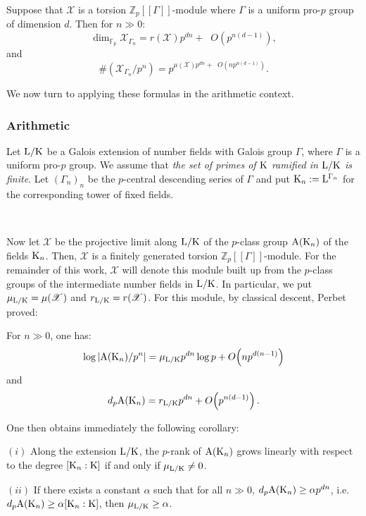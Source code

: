 \documentclass[12pt,a4paper,twoside,english]{smfart}
\def\K{{\rm K}}
\def\L{{\rm L}}
\def\Z{{\mathbb Z}}
\def\fq{{\mathbb F}}
\def\X{{\mathcal X}}
\def\A{{\rm A}}
\newcommand{\bigO}[1]{\ensuremath{\mathop{}\mathopen{}O\mathopen{}\left(#1\right)}}
\begin{document}
\begin{theo} Suppose that   $\X$ is a torsion $\Z_p[[\Gamma]]$-module where $\Gamma$ is a uniform pro-$p$ group of dimension $d$.   Then for $n \gg 0$:
 $$\dim_{\fq_p} \X_{\Gamma_n} =r(\X) p^{dn} + \bigO{p^{n(d-1)}},$$
 and
 $$\# (\X_{\Gamma_n}/p^n) = p^{\mu(\X) p^{dn} + \bigO{np^{n(d-1)}}}.$$
\end{theo}

We now turn to applying these formulas in the arithmetic context. 

\subsubsection{Arithmetic}\label{sectionarithmetic}

Let $\L/\K$  be a Galois extension of number fields with Galois group $\Gamma$, where $\Gamma$ is a uniform pro-$p$ group.
We assume that \emph{the set of primes of $\K$ ramified in $\L/\K$ is finite}.
Let $(\Gamma_n)_n$ be the $p$-central descending series of $\Gamma$ and put $\K_n:=\L^{\Gamma_n}$ for the corresponding tower of fixed fields. 

\

Now let  $\X$ be the projective limit along $\L/\K$ of the $p$-class group $\A(\K_n)$ of the fields $\K_n$. 
Then, $\X$ is a finitely generated torsion $\Z_p[[\Gamma]]$-module.  For the remainder of this work, $\X$ will denote this module built up from the $p$-class groups of the intermediate number fields in $\L/\K$.  In particular, we put $\mu_{\L/\K}=\mu(\X)$ and $r_{\L/\K}=r(\X)$.  For this module, by classical descent, Perbet proved:

\begin{theo} For $n \gg 0$, one has:  $$\log |\A(\K_n)/p^n| = \mu_{\L/\K} p^{dn} \log p   + \bigO{np^{d(n-1)}}$$
 and $$d_p\A(\K_n)= r_{\L/\K} p^{dn} +\bigO{p^{n(d-1)}}.$$ 
\end{theo}

One then obtains immediately the following corollary:

\begin{coro}\label{critereminorationmu}

$(i)$ 
 Along the extension $\L/\K$, the $p$-rank of $\A(\K_n)$ 
 grows linearly with respect to the degree $[\K_n:\K]$
 if and only if $\mu_{\L/\K} \neq 0$.
 
 $(ii)$ If there exists a constant $\alpha$ such that for all $n\gg 0$,  $d_p \A(\K_n) \geq \alpha p^{dn}$, i.e. $d_p \A(\K_n) \geq \alpha[\K_n:\K]$, then $\mu_{\L/\K} \geq \alpha$. 
\end{coro}
\end{document}
